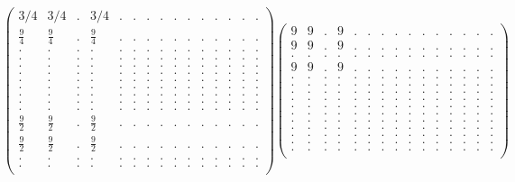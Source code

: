 \documentclass[12pt,a4paper]{amsart}
\begin{document}
\begin{align*}
\left(\begin{array}{rrrrrrrrrrrrrrr}%
3/4&3/4&.&3/4&.&.&.&.&.&.&.&.&.&.&.\\%
\frac{9}{4}&\frac{9}{4}&.&\frac{9}{4}&.&.&.&.&.&.&.&.&.&.&.\\%
.&.&.&.&.&.&.&.&.&.&.&.&.&.&.\\%
.&.&.&.&.&.&.&.&.&.&.&.&.&.&.\\%
.&.&.&.&.&.&.&.&.&.&.&.&.&.&.\\%
.&.&.&.&.&.&.&.&.&.&.&.&.&.&.\\%
.&.&.&.&.&.&.&.&.&.&.&.&.&.&.\\%
.&.&.&.&.&.&.&.&.&.&.&.&.&.&.\\%
.&.&.&.&.&.&.&.&.&.&.&.&.&.&.\\%
.&.&.&.&.&.&.&.&.&.&.&.&.&.&.\\%
.&.&.&.&.&.&.&.&.&.&.&.&.&.&.\\%
\frac{9}{2}&\frac{9}{2}&.&\frac{9}{2}&.&.&.&.&.&.&.&.&.&.&.\\%
\frac{9}{2}&\frac{9}{2}&.&\frac{9}{2}&.&.&.&.&.&.&.&.&.&.&.\\%
.&.&.&.&.&.&.&.&.&.&.&.&.&.&.\\%
.&.&.&.&.&.&.&.&.&.&.&.&.&.&.\\%
\end{array}\right)%
\left(\begin{array}{rrrrrrrrrrrrrrr}%
9&9&.&9&.&.&.&.&.&.&.&.&.&.&.\\%
9&9&.&9&.&.&.&.&.&.&.&.&.&.&.\\%
.&.&.&.&.&.&.&.&.&.&.&.&.&.&.\\%
9&9&.&9&.&.&.&.&.&.&.&.&.&.&.\\%
.&.&.&.&.&.&.&.&.&.&.&.&.&.&.\\%
.&.&.&.&.&.&.&.&.&.&.&.&.&.&.\\%
.&.&.&.&.&.&.&.&.&.&.&.&.&.&.\\%
.&.&.&.&.&.&.&.&.&.&.&.&.&.&.\\%
.&.&.&.&.&.&.&.&.&.&.&.&.&.&.\\%
.&.&.&.&.&.&.&.&.&.&.&.&.&.&.\\%
.&.&.&.&.&.&.&.&.&.&.&.&.&.&.\\%
.&.&.&.&.&.&.&.&.&.&.&.&.&.&.\\%
.&.&.&.&.&.&.&.&.&.&.&.&.&.&.\\%
.&.&.&.&.&.&.&.&.&.&.&.&.&.&.\\%
.&.&.&.&.&.&.&.&.&.&.&.&.&.&.\\%
\end{array}\right)%
\end{align*}
\end{document}

